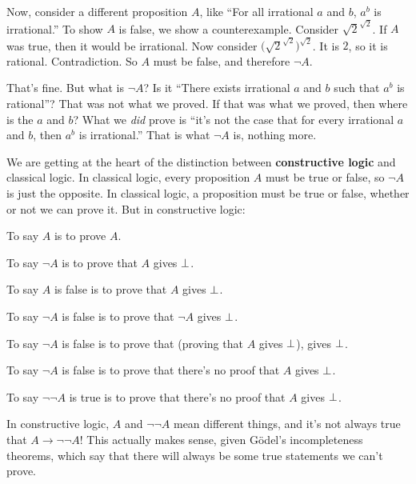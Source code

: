 \documentclass[11pt,paper=letter]{scrartcl}
\renewcommand{\lnot}{\neg}
\begin{document}
Now, consider a different proposition $A$, like ``For all irrational $a$ and $b$, $a^b$ is irrational.'' To show $A$ is false, we show a counterexample. Consider $\sqrt{2}^{\sqrt{2}}$. If $A$ was true, then it would be irrational. Now consider $\Big(\sqrt{2}^{\sqrt{2}}\Big)^{\sqrt{2}}$. It is $2$, so it is rational. Contradiction. So $A$ must be false, and therefore $\lnot A$.

That's fine. But what is $\lnot A$? Is it ``There exists irrational $a$ and $b$ such that $a^b$ is rational''? That was not what we proved. If that was what we proved, then where is the $a$ and $b$? What we \emph{did} prove is ``it's not the case that for every irrational $a$ and $b$, then $a^b$ is irrational.'' That is what $\lnot A$ is, nothing more.



We are getting at the heart of the distinction between \textbf{constructive logic} and classical logic. In classical logic, every proposition $A$ must be true or false, so $\lnot A$ is just the opposite. In classical logic, a proposition must be true or false, whether or not we can prove it. But in constructive logic:
\begin{itemthin}
\item To say $A$ is to prove $A$.
\item To say $\lnot A$ is to prove that $A$ gives $\bot$.
\item To say $A$ is false is to prove that $A$ gives $\bot$.
\item To say $\lnot A$ is false is to prove that $\lnot A$ gives $\bot$.
\item To say $\lnot A$ is false is to prove that (proving that $A$ gives $\bot$), gives $\bot$.
\item To say $\lnot A$ is false is to prove that there's no proof that $A$ gives $\bot$.
\item To say $\lnot \lnot A$ is true is to prove that there's no proof that $A$ gives $\bot$.
\end{itemthin}
In constructive logic, $A$ and $\lnot\lnot A$ mean different things, and it's not always true that $A \to \lnot\lnot A$! This actually makes sense, given Gödel's incompleteness theorems, which say that there will always be some true statements we can't prove.
\end{document}
